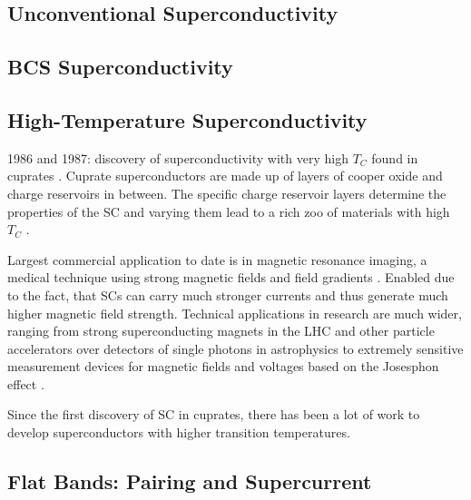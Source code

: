 \documentclass[../notes.tex]{subfiles}
\begin{document}
\subsection*{Unconventional Superconductivity}


\subsection*{BCS Superconductivity}

\subsection*{High-Temperature Superconductivity}

1986 and 1987: discovery of superconductivity with very high \(T_C\) found in cuprates \cite{bednorzPossibleHighTc1986,uchidaHighTcSuperconductivity1987}.
Cuprate superconductors are made up of layers of cooper oxide and charge reservoirs in between.
The specific charge reservoir layers determine the properties of the SC and varying them lead to a rich zoo of materials with high \(T_C\)  \cite{rybickiPerspectivePhaseDiagram2016}.

Largest commercial application to date is in magnetic resonance imaging, a medical technique using strong magnetic fields and field gradients \cite{rinckMagneticResonanceMedicine}.
Enabled due to the fact, that SCs can carry much stronger currents and thus generate much higher magnetic field strength.
Technical applications in research are much wider, ranging from strong superconducting magnets in the LHC \cite{tollestrupDevelopmentSuperconductingMagnets2008, rossiParticleAcceleratorsCuprate2023} and other particle accelerators over detectors of single photons in astrophysics \cite{irwinTransitionEdgeSensors2005} to extremely sensitive measurement devices for magnetic fields \cite{faleyHighTcSQUIDBiomagnetometers2017} and voltages \cite{klushinPresentFutureHightemperature2020} based on the Josesphon effect \cite{josephsonPossibleNewEffects1962}.


Since the first discovery of SC in cuprates, there has been a lot of work to develop superconductors with higher transition temperatures.

\subsection*{Flat Bands: Pairing and Supercurrent}
\end{document}
